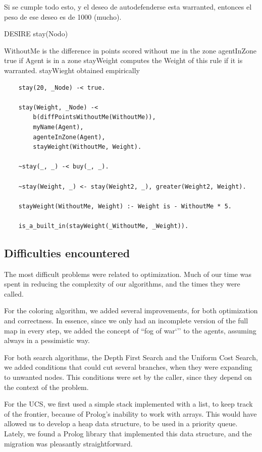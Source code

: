     Si se cumple todo esto, y el deseo de autodefenderse esta warranted,
    entonces el peso de ese deseo es de 1000 (mucho).

    DESIRE stay(Nodo)

    WithoutMe is the difference in points scored without me in the zone 
    agentInZone true if Agent is in a zone                                          
    stayWeight computes the Weight of this rule if it is warranted.                
    stayWieght obtained empirically

    \begin{small}
    \begin{verbatim}
    stay(20, _Node) -< true.

    stay(Weight, _Node) -< 
        b(diffPointsWithoutMe(WithoutMe)),
        myName(Agent),                    
        agenteInZone(Agent),              
        stayWeight(WithoutMe, Weight).    

    ~stay(_, _) -< buy(_, _).

    ~stay(Weight, _) <- stay(Weight2, _), greater(Weight2, Weight).

    stayWeight(WithoutMe, Weight) :- Weight is - WithoutMe * 5.
        
    is_a_built_in(stayWeight(_WithoutMe, _Weight)).
    \end{verbatim}
    \end{small}

\subsection{Difficulties encountered}
    The most difficult problems were related to optimization. Much of our time was 
    spent in reducing the complexity of our algorithms, and the times they 
    were called.

    For the coloring algorithm, we added several improvements, for both 
    optimization and correctness. In essence, since we only had an incomplete 
    version of the full map in every step, we added the concept of ``fog of war`'' 
    to the agents, assuming always in a pessimistic way. 

    For both search algorithms, the Depth First Search and the Uniform Cost 
    Search, we added conditions that could cut several branches, when they were 
    expanding to unwanted nodes. This conditions were set by the caller, since 
    they depend on the context of the problem.

    For the UCS, we first used a simple stack implemented with a list, to keep 
    track of the frontier, because of Prolog's inability to work with arrays. This 
    would have allowed us to develop a heap data structure, to be used in a 
    priority queue. Lately, we found a Prolog library that implemented this data 
    structure, and the migration was pleasantly straightforward.

